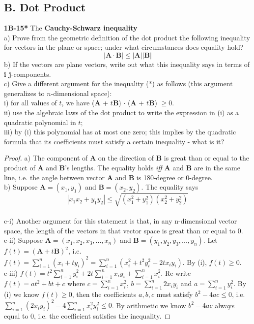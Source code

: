\documentclass{article}
\begin{document}
\subsection{B. Dot Product}
%
%
\textbf{1B-15*} The \textbf{Cauchy-Schwarz inequality}
\\ a) Prove from the geometric definition of the dot product the following inequality for vectors in the plane or space; under what circumstances does equality hold?
\begin{equation}
    |\mathbf{A} \cdot \mathbf{B} | \leq |\mathbf{A}||\mathbf{B}|
\end{equation}
b) If the vectors are plane vectors, write out what this inequality says in terms of \textbf{i j}-components.
\\c) Give a different argument for the inequality (*) as follows (this argument generalizes to $n$-dimensional space):
\\i) for all values of $t$, we have (\textbf{A} + $t$\textbf{B}) $\cdot$ (\textbf{A} + $t$\textbf{B}) $\geq 0$.
\\ii) use the algebraic laws of the dot product to write the expression in (i) as a quadratic polynomial in $t$;
\\iii) by (i) this polynomial has at most one zero; this implies by the quadratic formula that its coefficients must satisfy a certain inequality - what is it?
%
%
\begin{proof}
a) The component of \textbf{A} on the direction of \textbf{B} is great than or equal to the product of \textbf{A} and \textbf{B}'s lengths. The equality holds \textit{iff} \textbf{A} and \textbf{B} are in the same line, i.e. the angle between vector \textbf{A} and \textbf{B} is 180-degree or 0-degree.
\\b) Suppose $\mathbf{A} = (x_1, y_1)$ and $\mathbf{B} = (x_2, y_2)$. The equality says
\begin{equation}
    |x_1x_2 + y_1y_2| \leq \sqrt{(x_1^2 + y_1^2)(x_2^2+y_2^2)}
\end{equation}
\\c-i) Another argument for this statement is that, in any n-dimensional vector space, the length of the vectors in that vector space is great than or equal to 0.
\\c-ii) Suppose $\mathbf{A} = (x_1, x_2, x_3, ..., x_n)$ and $\mathbf{B} = (y_1, y_2, y_3, ..., y_n)$. Let $f(t) = (\mathbf{A} + t\mathbf{B})^2$, i.e. $f(t) = \sum_{i=1}^n (x_i + ty_i)^2 = \sum_{i=1}^n ( x_i^2 + t^2y_i^2 + 2tx_iy_i)$. By (i), $f(t) \geq 0$.
\\c-iii) $f(t) = t^2 \sum_{i=1}^ny_i^2 + 2t \sum_{i=1}^n x_iy_i + \sum_{i=1}^n x_i^2$. Re-write $f(t) = at^2 + bt + c$ where $c = \sum_{i=1}^n x_i^2$, $b = \sum_{i=1}^n 2x_iy_i$ and $a = \sum_{i=1}^n y_i^2$. By (i) we know $f(t) \geq 0$, then the coefficients $a,b,c$ must satisfy $b^2 - 4ac \leq 0$, i.e. $\sum_{i=1}^n (2x_iy_i)^2 - 4\sum_{i=1}^n x_i^2y_i^2 \leq 0 $. By arithmetic we know $b^2 - 4ac$ always equal to $0$, i.e. the coefficient satisfies the inequality.
\end{proof}
%
%
\end{document}
